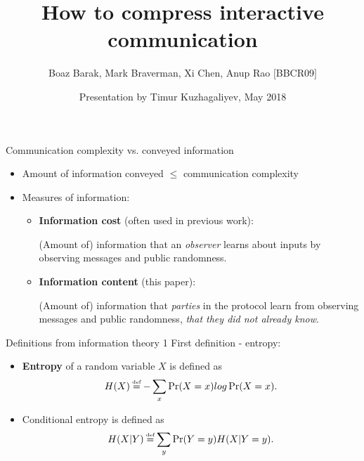 \documentclass[10pt]{beamer}
\title[Compressing interactive communication]{How to compress interactive communication}
\author{Boaz Barak, Mark Braverman, Xi Chen, Anup Rao $[$BBCR09$]$}
\date{Presentation by Timur Kuzhagaliyev, May 2018}
\newcommand\defeq{\mathrel{\stackrel{\makebox[0pt]{\mbox{\normalfont\tiny def}}}{=}}}
\begin{document}
\begin{frame}
  \titlepage
\end{frame}

\begin{frame}{Communication complexity vs. conveyed information}
\begin{itemize}
    \pause
    \item Amount of information conveyed $\leq$ communication complexity
    \vskip 0.6cm
    \pause
    \item Measures of information:
    \begin{itemize}
        \vskip 0.3cm
        \pause
        \item \textbf{Information cost} (often used in previous work):
            \begin{addmargin}[1em]{2em}%
            (Amount of) information that an \textit{observer} learns about inputs by observing messages and public randomness.
            \end{addmargin}
            \vskip 0.3cm
        \pause
        \item \textbf{Information content} (this paper):
            \begin{addmargin}[1em]{2em}
            (Amount of) information that \textit{parties} in the protocol learn from observing messages and public randomness, \textit{that they did not already know}.
            \end{addmargin}
    \end{itemize}
\end{itemize}
\end{frame}

\begin{frame}{Definitions from information theory 1}
First definition - entropy:
\pause
    \begin{itemize}
        \item \textbf{Entropy} of a random variable $X$ is defined as
        $$ H(X) \defeq - \sum_{x} \Pr(X = x) log \Pr(X = x). $$
        \pause
        \item Conditional entropy is defined as
        $$ H(X|Y) \defeq \sum_{y} \Pr(Y = y) H(X|Y=y). $$
    \end{itemize}
\end{frame}
\end{document}
